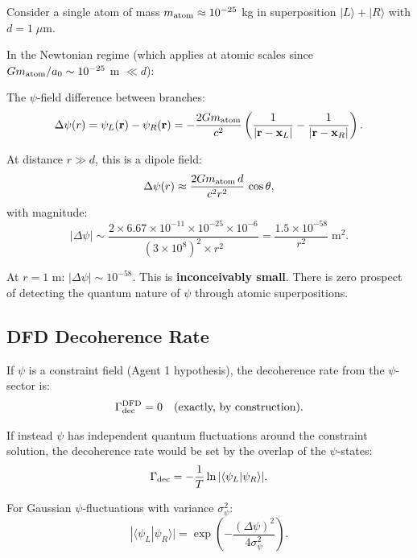 \documentclass[11pt,a4paper]{article}
\begin{document}
Consider a single atom of mass $m_{\rm atom} \approx 10^{-25}$ kg in superposition $|L\rangle + |R\rangle$ with $d = 1\;\mu$m.

In the Newtonian regime (which applies at atomic scales since $Gm_{\rm atom}/a_0 \sim 10^{-25}$ m $\ll d$):

The $\psi$-field difference between branches:
\begin{equation}
\Delta\psi(r) = \psi_L(\mathbf{r}) - \psi_R(\mathbf{r})
= -\frac{2Gm_{\rm atom}}{c^2}\left(\frac{1}{|\mathbf{r}-\mathbf{x}_L|} - \frac{1}{|\mathbf{r}-\mathbf{x}_R|}\right).
\end{equation}

At distance $r \gg d$, this is a dipole field:
\begin{equation}
\Delta\psi(r) \approx \frac{2Gm_{\rm atom}\,d}{c^2 r^2}\,\cos\theta,
\end{equation}
with magnitude:
\begin{equation}
|\Delta\psi| \sim \frac{2\times 6.67\times 10^{-11} \times 10^{-25} \times 10^{-6}}{(3\times 10^8)^2 \times r^2}
= \frac{1.5\times 10^{-58}}{r^2}\;\text{m}^2.
\end{equation}

At $r = 1$ m: $|\Delta\psi| \sim 10^{-58}$. This is \textbf{inconceivably small}. There is zero prospect of detecting the quantum nature of $\psi$ through atomic superpositions.

\subsection{DFD Decoherence Rate}
\label{sec:decoherence-rate}

If $\psi$ is a constraint field (Agent 1 hypothesis), the decoherence rate from the $\psi$-sector is:
\begin{equation}
\Gamma_{\rm dec}^{\rm DFD} = 0\quad\text{(exactly, by construction)}.
\end{equation}

If instead $\psi$ has independent quantum fluctuations around the constraint solution, the decoherence rate would be set by the overlap of the $\psi$-states:
\begin{equation}
\Gamma_{\rm dec} = -\frac{1}{T}\ln|\langle\psi_L|\psi_R\rangle|.
\end{equation}

For Gaussian $\psi$-fluctuations with variance $\sigma_\psi^2$:
\begin{equation}
|\langle\psi_L|\psi_R\rangle| = \exp\left(-\frac{(\Delta\psi)^2}{4\sigma_\psi^2}\right).
\end{equation}
\end{document}
